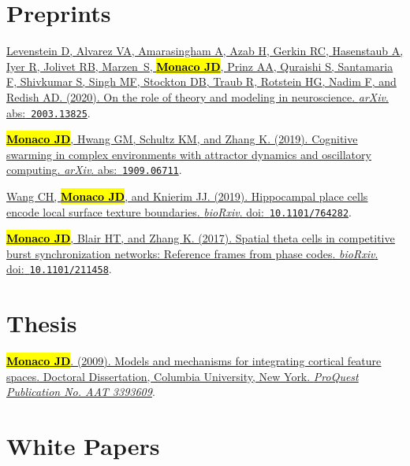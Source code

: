 \documentclass[10pt]{article}
\newcommand{\itemtitle}[1]{{\color{hopkinsblue}\ul{#1}}}
\newcommand{\joehl}[1]{\hl{\textbf{#1}}}
\newcommand{\doi}[1]{{\color{darkgray}doi:}~{\color{dimgray}\texttt{#1}}}
\newcommand{\abs}[1]{{\color{darkgray}abs:}~{\color{dimgray}\texttt{#1}}}
\begin{document}
\section*{Preprints}

\begin{description}
  \item \href{https://arxiv.org/abs/2003.13825}
    {Levenstein D, Alvarez VA, Amarasingham A, Azab H, Gerkin RC, Hasenstaub
      A, Iyer R, Jolivet RB, Marzen~S, \joehl{Monaco JD}, Prinz AA, Quraishi
      S, Santamaria F, Shivkumar S, Singh MF, Stockton DB, Traub R, Rotstein
      HG, Nadim F, and Redish AD. (2020). \itemtitle{On the role of theory and
    modeling in neuroscience}. \emph{arXiv}. \abs{2003.13825}}.
  \item \href{https://arxiv.org/abs/1909.06711}
    {\joehl{Monaco JD}, Hwang GM, Schultz KM, and Zhang K. (2019).
    \itemtitle{Cognitive swarming in complex environments with attractor
    dynamics and oscillatory computing}. \emph{arXiv}. \abs{1909.06711}}.
  \item \href{http://doi.org/10.1101/764282}
    {Wang CH, \joehl{Monaco JD}, and Knierim JJ. (2019). \itemtitle{Hippocampal
      place cells encode local surface texture boundaries}. \emph{bioRxiv}.
    \doi{10.1101/764282}}.
  \item \href{http://dx.doi.org/10.1101/211458}
    {\joehl{Monaco JD}, Blair HT, and Zhang K. (2017). \itemtitle{Spatial theta
        cells in competitive burst synchronization networks: Reference frames from
    phase codes}. \emph{bioRxiv}. \doi{10.1101/211458}}.
\end{description}

\section*{Thesis}

\begin{description}
  \item \href{http://search.proquest.com/docview/304862872/abstract}
    {\joehl{Monaco JD}. (2009). \itemtitle{Models and mechanisms for integrating
      cortical feature spaces}. Doctoral Dissertation, Columbia University, New
    York. \emph{ProQuest Publication No. AAT 3393609}}.
\end{description}

\section*{White Papers} \label{sec:whitepapers}
\end{document}
